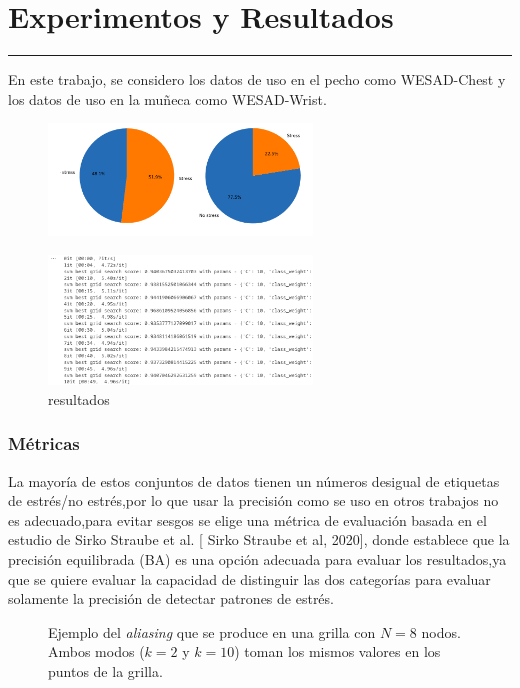 \chapter{Experimentos y Resultados}
\hrule \bigskip \vspace*{1cm}

En este trabajo, se considero  los datos de uso en el pecho como WESAD-Chest y los datos de uso en la muñeca como WESAD-Wrist.


\begin{figure}[h]
    \centering
    \includegraphics[width=7cm]{Graficos/stress.png}
    \label{fig:enter-label}
\end{figure}



\begin{figure}[h]
    \centering
    \includegraphics[width=7cm]{Graficos/capturaresutado.png}
    \caption{resultados}
    \label{fig:enter-label}
\end{figure}


\subsection{Métricas}

La mayoría de estos conjuntos de datos tienen un  números desigual de etiquetas de estrés/no estrés,por lo que usar la precisión como se uso en otros trabajos no es adecuado,para evitar sesgos  se elige una métrica de evaluación basada en el estudio  de   Sirko Straube et al. [ Sirko Straube et al, 2020], donde establece que la precisión equilibrada (BA)  es una opción adecuada para evaluar los resultados,ya que se quiere evaluar la capacidad de   distinguir las dos categorías para evaluar solamente  la precisión de detectar patrones de estrés.




\begin{figure}[!tb]
    \centering

    \caption{Ejemplo del \emph{aliasing} que se produce en una grilla con $N = 8$ nodos. Ambos modos
        ($k = 2$ y $k = 10$) toman los mismos valores en los puntos de la grilla.} \label{fig-2}
\end{figure}
